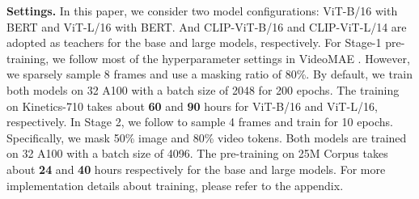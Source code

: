 \documentclass[10pt,twocolumn,letterpaper]{article}
\begin{document}
\textbf{Settings.}
In this paper, 
we consider two model configurations: 
ViT-B/16 \cite{vit} with BERT \cite{devlin2018bert} and ViT-L/16 with BERT. 
And CLIP-ViT-B/16 \cite{clip} and CLIP-ViT-L/14 are adopted as teachers for the base and large models, respectively.
For Stage-1 pre-training, 
we follow most of the hyperparameter settings in VideoMAE \cite{videomae}. 
However, 
we sparsely sample \cite{tsn} 8 frames and use a masking ratio of 80\%. 
By default,
we train both models on 32 A100 with a batch size of 2048 for 200 epochs.
The training on Kinetics-710 takes about \textbf{60} and \textbf{90} hours for ViT-B/16 and ViT-L/16, respectively.
In Stage 2,
we follow \cite{lei2022revealing} to sample 4 frames and train for 10 epochs. 
Specifically,
we mask 50\% image and 80\% video tokens.
Both models are trained on 32 A100 with a batch size of 4096. 
The pre-training on 25M Corpus takes about \textbf{24} and \textbf{40} hours respectively for the base and large models. 
For more implementation details about training, 
please refer to the appendix.
\end{document}
